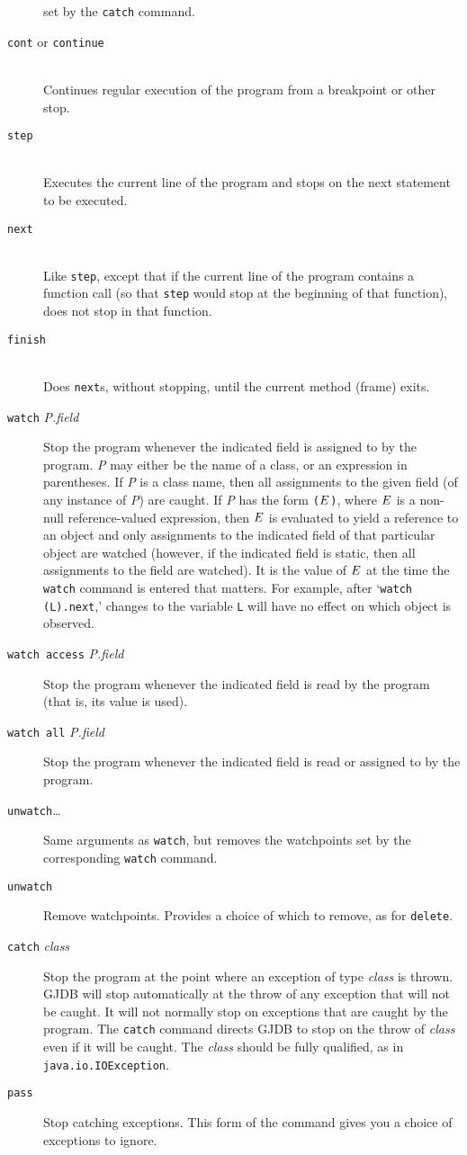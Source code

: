 \documentclass[11pt,twoside]{handout}
\begin{document}
\begin{description}
set by the {\tt catch} command.
\item[\rm{\tt cont} or {\tt continue}]  \ \\
Continues regular execution of  the program from a breakpoint or other stop.
\item[\tt step] \ \\
Executes the current line of the program and stops on the next statement to
be executed.  
\item[\tt next] \ \\
Like {\tt step}, except that if the current line of the program contains a
function call (so that {\tt step} would stop at the beginning of that
function), does not stop in that function.    
\item[\tt finish] \ \\
Does {\tt next}s, without stopping, until the 
current method (frame) exits.
\item[{\tt watch} {\it P.field}] Stop the program whenever
the indicated field is assigned to by the program. {\it P\/} may either
be the name of a class, or an expression in parentheses.  If {\it P\/}
is a class name, then all assignments to the given field (of any
instance of {\it P\/}) are caught.  If {\it P\/} has the form
{\tt($E\/$)}, where $E\/$ is a non-null reference-valued expression,
then $E\/$ is evaluated to yield a reference to an object
and only assignments to the indicated field of that particular object
are watched (however, if the indicated field is static, then all
assignments to the field are watched).  It is the value of $E\/$ at
the time the {\tt watch} command is entered that matters.    For
example, after `{\tt watch (L).next},' changes to the variable {\tt L}
will have no effect on which object is observed.
\item[{\tt watch access} {\it P.field}] Stop the program whenever
the indicated field is read by the program (that is, its value is used).
\item[{\tt watch all} {\it P.field}] Stop the program whenever
the indicated field is read or assigned to by the program.
\item[{\tt unwatch}\dots] Same arguments as {\tt watch}, but removes
the watchpoints set by the corresponding {\tt watch} command.
\item[{\tt unwatch}] Remove watchpoints. Provides a choice of which to
remove, as for {\tt delete}.
\item[{\tt catch} {\it class\/}] Stop the program at the point where
an exception of type {\it class\/} is thrown. GJDB will
stop automatically at the throw of any exception that will not be caught.
It will not normally stop on exceptions that are caught by the
program.
The {\tt catch} command directs GJDB to stop on the throw of {\it
class\/} even if it will be caught.  The {\it class\/} should be fully
qualified, as in {\tt java.io.IOException}.
\item[{\tt pass}] Stop catching exceptions.  This form of the
command gives you a choice of exceptions to ignore.
\end{description}
\end{document}
